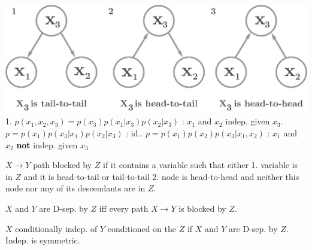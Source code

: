 \includegraphics[width=\linewidth]{figs/bayes.png}
1. $p(x_1, x_2, x_3) = p(x_3)p(x_1|x_3)p(x_2|x_3)$ : $x_1$ and $x_2$  indep. given $x_3$. $p = p(x_1)p(x_3|x_1)p(x_2|x_3)$ : id.. $p = p(x_1)p(x_2)p(x_3|x_1, x_2)$ : $x_1$ and $x_2$  \textbf{not} indep. given $x_3$

$X \rightarrow Y$ path blocked by $Z$ if it contains a variable such that either
1. variable is in $Z$ and it is head-to-tail or tail-to-tail
2. node is head-to-head and neither this node nor any of its descendants are in $Z$.

$X$ and $Y$ are D-sep. by $Z$ iff every path $X \rightarrow Y$ is blocked by $Z$.

$X$ conditionally indep. of $Y$ conditioned on the $Z$ if $X$ and $Y$ are D-sep. by $Z$. Indep. is symmetric.

